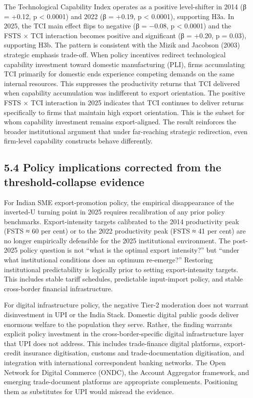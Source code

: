 \documentclass[
  12pt]{article}
\begin{document}
The Technological Capability Index operates as a positive level-shifter
in 2014 (β = +0.12, p \textless{} 0.0001) and 2022 (β = +0.19, p
\textless{} 0.0001), supporting H3a. In 2025, the TCI main effect flips
to negative (β = −0.08, p \textless{} 0.0001) and the FSTS × TCI
interaction becomes positive and significant (β = +0.20, p = 0.03),
supporting H3b. The pattern is consistent with the Mizik and Jacobson
(2003) strategic emphasis trade-off. When policy incentives redirect
technological capability investment toward domestic manufacturing (PLI),
firms accumulating TCI primarily for domestic ends experience competing
demands on the same internal resources. This suppresses the productivity
returns that TCI delivered when capability accumulation was indifferent
to export orientation. The positive FSTS × TCI interaction in 2025
indicates that TCI continues to deliver returns specifically to firms
that maintain high export orientation. This is the subset for whom
capability investment remains export-aligned. The result reinforces the
broader institutional argument that under far-reaching strategic
redirection, even firm-level capability constructs behave differently.

\hypertarget{policy-implications-corrected-from-the-threshold-collapse-evidence}{%
\subsection{5.4 Policy implications corrected from the
threshold-collapse
evidence}\label{policy-implications-corrected-from-the-threshold-collapse-evidence}}

For Indian SME export-promotion policy, the empirical disappearance of
the inverted-U turning point in 2025 requires recalibration of any prior
policy benchmarks. Export-intensity targets calibrated to the 2014
productivity peak (FSTS ≈ 60 per cent) or to the 2022 productivity peak
(FSTS ≈ 41 per cent) are no longer empirically defensible for the 2025
institutional environment. The post-2025 policy question is not ``what
is the optimal export intensity?'' but ``under what institutional
conditions does an optimum re-emerge?'' Restoring institutional
predictability is logically prior to setting export-intensity targets.
This includes stable tariff schedules, predictable input-import policy,
and stable cross-border financial infrastructure.

For digital infrastructure policy, the negative Tier-2 moderation does
not warrant disinvestment in UPI or the India Stack. Domestic digital
public goods deliver enormous welfare to the population they serve.
Rather, the finding warrants explicit policy investment in the
cross-border-specific digital infrastructure layer that UPI does not
address. This includes trade-finance digital platforms, export-credit
insurance digitisation, customs and trade-documentation digitisation,
and integration with international correspondent banking networks. The
Open Network for Digital Commerce (ONDC), the Account Aggregator
framework, and emerging trade-document platforms are appropriate
complements. Positioning them as substitutes for UPI would misread the
evidence.
\end{document}
